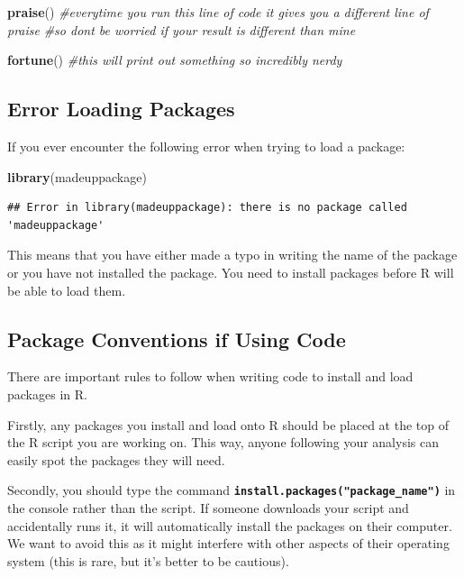 \documentclass[
]{book}
\newenvironment{Shaded}{\begin{snugshade}}{\end{snugshade}}
\newcommand{\CommentTok}[1]{\textcolor[rgb]{0.56,0.35,0.01}{\textit{#1}}}
\newcommand{\FunctionTok}[1]{\textcolor[rgb]{0.13,0.29,0.53}{\textbf{#1}}}
\newcommand{\NormalTok}[1]{#1}
\begin{document}
\begin{Shaded}
\begin{Highlighting}[]
\FunctionTok{praise}\NormalTok{() }\CommentTok{\#everytime you run this line of code it gives you a different line of praise}
\CommentTok{\#so don\textquotesingle{}t be worried if your result is different than mine}

\FunctionTok{fortune}\NormalTok{() }\CommentTok{\#this will print out something so incredibly nerdy }
\end{Highlighting}
\end{Shaded}

\hypertarget{error-loading-packages}{%
\subsection{Error Loading Packages}\label{error-loading-packages}}

If you ever encounter the following error when trying to load a package:

\begin{Shaded}
\begin{Highlighting}[]
\FunctionTok{library}\NormalTok{(madeuppackage)}
\end{Highlighting}
\end{Shaded}

\begin{verbatim}
## Error in library(madeuppackage): there is no package called 'madeuppackage'
\end{verbatim}

This means that you have either made a typo in writing the name of the package or you have not installed the package. You need to install packages before R will be able to load them.

\hypertarget{package-conventions-if-using-code}{%
\subsection{Package Conventions if Using Code}\label{package-conventions-if-using-code}}

There are important rules to follow when writing code to install and load packages in R.

Firstly, any packages you install and load onto R should be placed at the top of the R script you are working on. This way, anyone following your analysis can easily spot the packages they will need.

Secondly, you should type the command \textbf{\texttt{install.packages("package\_name")}} in the console rather than the script. If someone downloads your script and accidentally runs it, it will automatically install the packages on their computer. We want to avoid this as it might interfere with other aspects of their operating system (this is rare, but it's better to be cautious).
\end{document}
